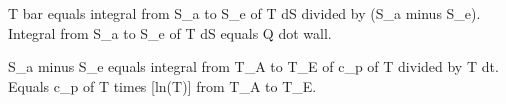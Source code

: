 T bar equals integral from S_a to S_e of T dS divided by (S_a minus S_e).  
Integral from S_a to S_e of T dS equals Q dot wall.  

S_a minus S_e equals integral from T_A to T_E of c_p of T divided by T dt.  
Equals c_p of T times [ln(T)] from T_A to T_E.